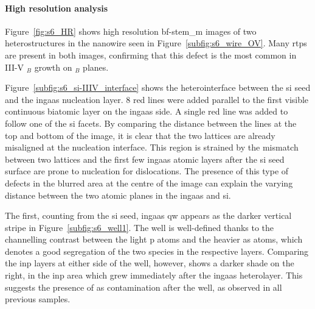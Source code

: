 \paragraph{High resolution analysis} Figure~\ref{fig:s6_HR} shows high resolution \acs{bf}-\acs{stem_m} images of two heterostructures in the nanowire seen in Figure~\ref{subfig:s6_wire_OV}. Many \acs{rtp}s are present in both images, confirming that this defect is the most common in III-V \(_B\) growth on \(_B\) planes. 

Figure~\ref{subfig:s6_si-IIIV_interface} shows the heterointerface between the \acl{si} seed and the \acs{ingaas} nucleation layer. \num{8} red lines were added parallel to the first visible continuous biatomic layer on the \acs{ingaas} side. A single red line was added to follow one of the \acs{si}  facets. By comparing the distance between the lines at the top and bottom of the image, it is clear that the two lattices are already misaligned at the nucleation interface. This region is strained by the mismatch between two lattices and the first few \acs{ingaas} atomic layers after the \acs{si} seed surface are prone to nucleation for dislocations. The presence of this type of defects in the blurred area at the centre of the image can explain the varying distance between the two  atomic planes in the \acs{ingaas} and \acs{si}.

The first, counting from the \acs{si} seed, \acs{ingaas} \acl{qw} appears as the darker vertical stripe in Figure~\ref{subfig:s6_well1}. The well is well-defined thanks to the channelling contrast between the light \acl{p} atoms and the heavier \acs{as} atoms, which denotes a good segregation of the two species in the respective layers. Comparing the \acs{inp} layers at either side of the well, however, shows a darker shade on the right, in the \acs{inp} area which grew immediately after the \acs{ingaas} heterolayer. This suggests the presence of \acl{as} contamination after the well, as observed in all previous samples.
\par

